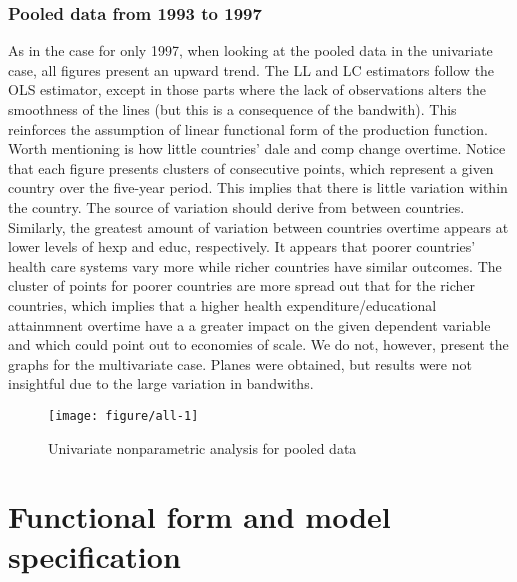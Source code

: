 \documentclass[12pt,a4paper]{article}\usepackage[]{graphicx}\usepackage[]{color}
\newenvironment{knitrout}{}{} %
\begin{document}
\subsubsection{Pooled data from 1993 to 1997}

As in the case for only 1997, when looking at the pooled data in the univariate case, all figures present an upward trend. The LL and LC estimators follow the OLS estimator, except in those parts where the lack of observations alters the smoothness of the lines (but this is a consequence of the bandwith). This reinforces the assumption of linear functional form of the production function. Worth mentioning is how little countries' dale and comp change overtime. Notice that each figure presents clusters of consecutive points, which represent a given country over the five-year period. This implies that there is little variation within the country. The source of variation should derive from between countries. Similarly, the greatest amount of variation between countries overtime appears at lower levels of hexp and educ, respectively. It appears that poorer countries' health care systems vary more while richer countries have similar outcomes. The cluster of points for poorer countries are more spread out that for the richer countries, which implies that a higher health expenditure/educational attainmnent overtime have a a greater impact on the given dependent variable and which could point out to economies of scale. We do not, however, present the graphs for the multivariate case. Planes were obtained, but results were not insightful due to the large variation in bandwiths.

\begin{knitrout}
\color{fgcolor}\begin{figure}[htbp]

{\centering \texttt{[image: figure/all-1]} 

}

\caption[Univariate nonparametric analysis for pooled data]{Univariate nonparametric analysis for pooled data}\label{fig:all}
\end{figure}


\end{knitrout}







\section{Functional form and model specification}
\end{document}
